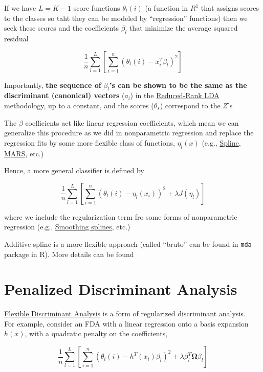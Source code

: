 \documentclass[
]{book}
\begin{document}
If we have \(L = K - 1\) score functions \(\theta_l(i)\) (a function in \(R^1\) that assigns scores to the classes so taht they can be modeled by ``regression'' functions) then we seek these scores and the coefficients \(\beta_l\) that minimize the average squared residual

\[
\frac{1}{n} \sum_{l=1}^L [\sum_{i=1}^n (\theta_l (i) - x_i^T \beta_l)^2]
\]

Importantly, \textbf{the sequence of} \(\beta_l\)\textbf{'s can be shown to be the same as the discriminant (canonical) vectors} (\(a_l\)) in the \protect\hyperlink{reduced-rank-lda}{Reduced-Rank LDA} methodology, up to a constant, and the scores (\(\theta_s\)) correspond to the \(Z\)'s

The \(\beta\) coefficients act like linear regression coefficients, which mean we can generalize this procedure as we did in nonparametric regression and replace the regression fits by some more flexible class of functions, \(\eta_l(x)\) (e.g., \protect\hyperlink{spline-regression}{Spline}, \protect\hyperlink{multivariate-adaptive-regression-splines}{MARS}, etc.)

Hence, a more general classifier is defined by

\[
\frac{1}{n} \sum_{l=1}^{L} [\sum_{i=1}^n (\theta_l(i) - \eta_l(x_i))^2 + \lambda J(\eta_l)]
\]

where we include the regularization term fro some forms of nonparametric regression (e.g., \protect\hyperlink{spline-regression}{Smoothing splines}, etc.)

Additive spline is a more flexible approach (called ``bruto'' can be found in \texttt{mda} package in R). More details can be found \citep[ 12.5.1]{hastie2001a}

\hypertarget{penalized-discriminant-analysis}{%
\section{Penalized Discriminant Analysis}\label{penalized-discriminant-analysis}}

\protect\hyperlink{flexible-discriminant-analysis}{Flexible Discriminant Analysis} is a form of regularized discriminant analysis.\\
For example, consider an FDA with a linear regression onto a basis expansion \(h(x)\), with a quadratic penalty on the coefficients,

\[
\frac{1}{n} \sum_{l = 1}^L [\sum_{i=1}^n ( \theta_l(i)- h^T (x_i)\beta_l)^2 + \lambda \beta_l^T \mathbf{\Omega} \beta_l]
\]
\end{document}
